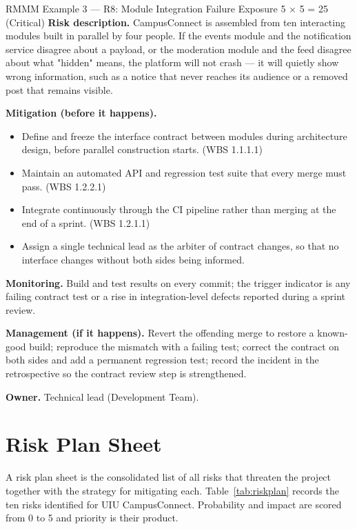 \documentclass[11pt,a4paper]{report}
\begin{document}
\begin{riskcard}{RMMM Example 3 --- R8: Module Integration Failure \hfill Exposure 5 $\times$ 5 = 25 (Critical)}
\textbf{Risk description.} CampusConnect is assembled from ten interacting
modules built in parallel by four people. If the events module and the
notification service disagree about a payload, or the moderation module and the
feed disagree about what "hidden" means, the platform will not crash --- it will
quietly show wrong information, such as a notice that never reaches its audience
or a removed post that remains visible.

\medskip
\textbf{Mitigation (before it happens).}
\begin{itemize}[nosep]
  \item Define and freeze the interface contract between modules during
  architecture design, before parallel construction starts. (WBS 1.1.1.1)
  \item Maintain an automated API and regression test suite that every merge
  must pass. (WBS 1.2.2.1)
  \item Integrate continuously through the CI pipeline rather than merging at
  the end of a sprint. (WBS 1.2.1.1)
  \item Assign a single technical lead as the arbiter of contract changes, so
  that no interface changes without both sides being informed.
\end{itemize}

\medskip
\textbf{Monitoring.} Build and test results on every commit; the trigger
indicator is any failing contract test or a rise in integration-level defects
reported during a sprint review.

\medskip
\textbf{Management (if it happens).} Revert the offending merge to restore a
known-good build; reproduce the mismatch with a failing test; correct the
contract on both sides and add a permanent regression test; record the incident
in the retrospective so the contract review step is strengthened.

\medskip
\textbf{Owner.} Technical lead (Development Team).
\end{riskcard}

\section{Risk Plan Sheet}
\label{sec:riskplan}

A risk plan sheet is the consolidated list of all risks that threaten the
project together with the strategy for mitigating each. Table~\ref{tab:riskplan}
records the ten risks identified for UIU CampusConnect. Probability and impact
are scored from 0 to 5 and priority is their product.
\end{document}
